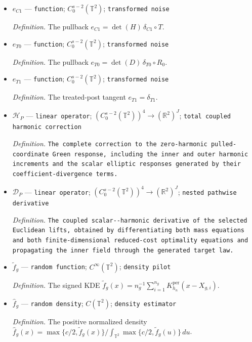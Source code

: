 \documentclass{article}
\begin{document}
\begin{itemize}
  \par\smallskip\noindent\emph{Definition.} The pullback \(e_{C0}=\det(D)\,\delta_{C0}\circ R_0\).
  \item \(e_{C1}\) --- \texttt{function}; \(C_0^{s-2}(\mathbb T^2)\); \texttt{transformed noise}
  \par\smallskip\noindent\emph{Definition.} The pullback \(e_{C1}=\det(H)\,\delta_{C1}\circ T\).
  \item \(e_{T0}\) --- \texttt{function}; \(C_0^{s-2}(\mathbb T^2)\); \texttt{transformed noise}
  \par\smallskip\noindent\emph{Definition.} The pullback \(e_{T0}=\det(D)\,\delta_{T0}\circ R_0\).
  \item \(e_{T1}\) --- \texttt{function}; \(C_0^{s-2}(\mathbb T^2)\); \texttt{transformed noise}
  \par\smallskip\noindent\emph{Definition.} The treated-post tangent \(e_{T1}=\delta_{T1}\).
  \item \(\mathcal H_P\) --- \texttt{linear operator}; \((C_0^{s-2}(\mathbb T^2))^4\to(\mathbb R^2)^J\); \texttt{total coupled harmonic correction}
  \par\smallskip\noindent\emph{Definition.} \texttt{The complete correction to the zero-\allowbreak{}harmonic pulled-\allowbreak{}coordinate Green response,\allowbreak{} including the inner and outer harmonic increments and the scalar elliptic responses generated by their coefficient-\allowbreak{}divergence terms.}
  \item \(\mathcal D_P\) --- \texttt{linear operator}; \((C_0^{s-2}(\mathbb T^2))^4\to(\mathbb R^2)^J\); \texttt{nested pathwise derivative}
  \par\smallskip\noindent\emph{Definition.} \texttt{The coupled scalar-\allowbreak{}-\allowbreak{}harmonic derivative of the selected Euclidean lifts,\allowbreak{} obtained by differentiating both mass equations and both finite-\allowbreak{}dimensional reduced-\allowbreak{}cost optimality equations and propagating the inner field through the generated target law.}
  \item \(\widetilde f_g\) --- \texttt{random function}; \(C^\infty(\mathbb T^2)\); \texttt{density pilot}
  \par\smallskip\noindent\emph{Definition.} The signed KDE \(\widetilde f_g(x)=n_g^{-1}\sum_{i=1}^{n_g}K_{h_n}^{\mathrm{per}}(x-X_{g,i})\).
  \item \(\widehat f_g\) --- \texttt{random density}; \(C(\mathbb T^2)\); \texttt{density estimator}
  \par\smallskip\noindent\emph{Definition.} The positive normalized density \(\widehat f_g(x)=\max\{c/2,\widetilde f_g(x)\}/\int_{\mathbb T^2}\max\{c/2,\widetilde f_g(u)\}\,du\).

\end{itemize}
\end{document}
